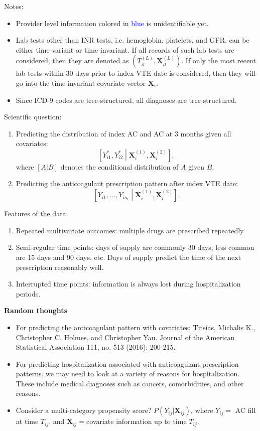 \documentclass[11pt]{article}
\begin{document}
Notes:
\begin{itemize}
    \item Provider level information colored in \textcolor{blue}{blue} is unidentifiable yet.
    \item Lab tests other than INR tests, i.e. hemoglobin, platelets, and GFR, can be either time-variant or time-invariant. If all records of such lab tests are considered, then they are denoted as $(T_{il}^{(L)}, \bm X_{il}^{(L)})$. If only the most recent lab tests within 30 days prior to index VTE date is considered, then they will go into the time-invariant covariate vector $\bm X_i$.
    \item Since ICD-9 codes are tree-structured, all diagnoses are tree-structured.
\end{itemize}

Scientific question: 
\begin{enumerate}
    \item Predicting the distribution of index AC and AC at 3 months given all covariates: 
    $$ \left[ Y_{i1}^*, Y_{i2}^* \middle| \bm X_i^{(1)}, \bm X_i^{(2)} \right], $$
    where $[A | B]$ denotes the conditional distribution of $A$ given $B$.
    \item Predicting the anticoagulant prescription pattern after index VTE date:
    $$ \left[ Y_{i1},\ldots, Y_{in_i} \middle| \bm X_i^{(1)}, \bm X_i^{(2)} \right]. $$
\end{enumerate}

Features of the data:
\begin{enumerate}
    \item Repeated multivariate outcomes: multiple drugs are prescribed repeatedly
    \item Semi-regular time points: days of supply are commonly 30 days; less common are 15 days and 90 days, etc. Days of supply predict the time of the next prescription reasonably well.
    \item Interrupted time points: information is always lost during hospitalization periods.
\end{enumerate}


\newpage
\textbf{Random thoughts} \\

\begin{itemize}
\item For predicting the anticoagulant pattern with covariates: Titsias, Michalis K., Christopher C. Holmes, and Christopher Yau.  Journal of the American Statistical Association 111, no. 513 (2016): 200-215.

\item For predicting hospitalization associated with anticoagulant prescription patterns, we may need to look at a variety of reasons for hospitalization. These include medical diagnoses such as cancers, comorbidities, and other reasons. 

\item Consider a multi-category propensity score? $P(Y_{ij} | \bm X_{ij})$, where $Y_{ij} = $ AC fill at time $T_{ij}$, and $\bm X_{ij} = $covariate information up to time $T_{ij}$.

\end{itemize}
\end{document}
